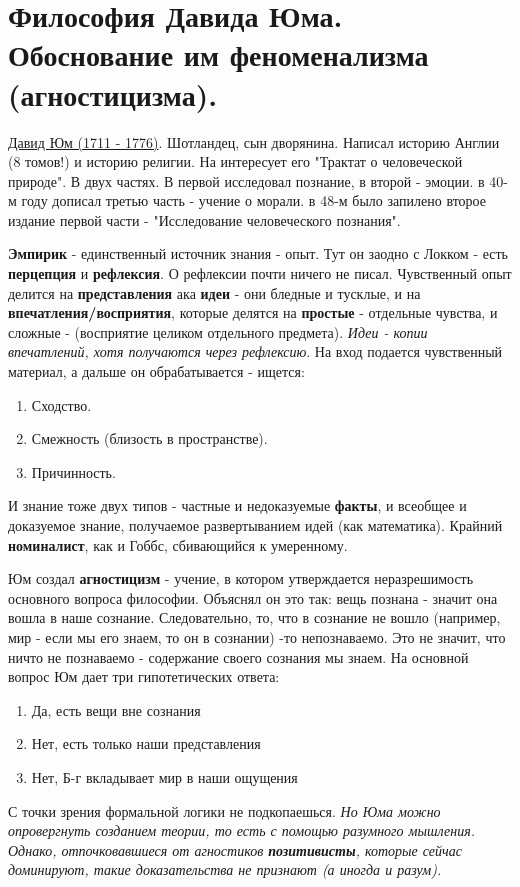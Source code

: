 \section{Философия Давида Юма. Обоснование им феноменализма (агностицизма).}
\underline{Давид Юм (1711 - 1776)}. Шотландец, сын дворянина. Написал историю Англии (8 томов!) и историю религии. На интересует его "Трактат о человеческой природе". В двух частях. В первой исследовал познание, в второй - эмоции. в 40-м году дописал третью часть - учение о морали. в 48-м было запилено второе издание первой части - "Исследование человеческого познания". 

\textbf{Эмпирик} - единственный источник знания - опыт. Тут он заодно с Локком - есть \textbf{перцепция} и \textbf{рефлексия}. О рефлексии почти ничего не писал. Чувственный опыт делится на \textbf{представления} ака \textbf{идеи} - они бледные и тусклые, и на \textbf{впечатления/восприятия}, которые делятся на \textbf{простые} - отдельные чувства, и сложные - (восприятие целиком отдельного предмета). \textit{Идеи - копии впечатлений, хотя получаются через рефлексию}. На вход подается чувственный материал, а дальше он обрабатывается - ищется:
\begin{enumerate}
\item Сходство.
\item Смежность (близость в пространстве).
\item Причинность.
\end{enumerate}
И знание тоже двух типов - частные и недоказуемые \textbf{факты}, и всеобщее и доказуемое знание, получаемое развертыванием идей (как математика). Крайний \textbf{номиналист}, как и Гоббс, сбивающийся к умеренному.

Юм создал \textbf{агностицизм} - учение, в котором утверждается неразрешимость основного вопроса философии. Объяснял он это так: вещь познана - значит она вошла в наше сознание. Следовательно, то, что в сознание не вошло (например, мир - если мы его знаем, то он в сознании)  -то непознаваемо. Это не значит, что ничто не познаваемо - содержание своего сознания мы знаем. На основной вопрос Юм дает три гипотетических ответа:
\begin{enumerate}
\item Да, есть вещи вне сознания
\item Нет, есть только наши представления
\item Нет, Б-г вкладывает мир в наши ощущения
\end{enumerate}
С точки зрения формальной логики не подкопаешься. \textit{Но Юма можно опровергнуть созданием теории, то есть с помощью разумного мышления. Однако, отпочковавшиеся от агностиков \textbf{позитивисты}, которые сейчас доминируют, такие доказательства не признают (а иногда и разум).}

